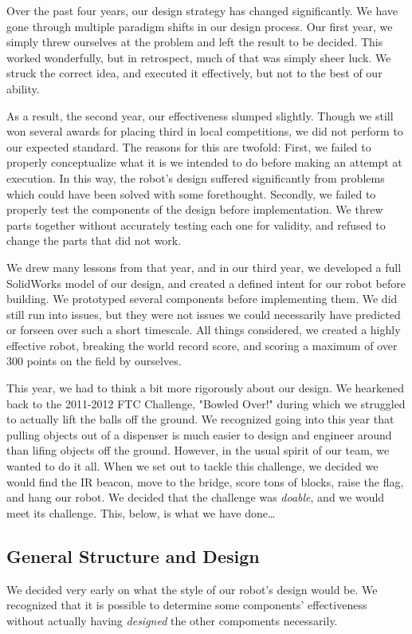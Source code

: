 \documentclass{article}
\begin{document}
Over the past four years, our design strategy has changed significantly. We have gone through multiple paradigm shifts in our design process. Our first year, we simply threw ourselves at the problem and left the result to be decided. This worked wonderfully, but in retrospect, much of that was simply sheer luck. We struck the correct idea, and executed it effectively, but not to the best of our ability. 

As a result, the second year, our effectiveness slumped slightly. Though we still won several awards for placing third in local competitions, we did not perform to our expected standard. The reasons for this are twofold: First, we failed to properly conceptualize what it is we intended to do before making an attempt at execution. In this way, the robot's design suffered significantly from problems which could have been solved with some forethought. Secondly, we failed to properly test the components of the design before implementation. We threw parts together without accurately testing each one for validity, and refused to change the parts that did not work.

We drew many lessons from that year, and in our third year, we developed a full SolidWorks model of our design, and created a defined intent for our robot before building. We prototyped several components before implementing them. We did still run into issues, but they were not issues we could necessarily have predicted or forseen over such a short timescale. All things considered, we created a highly effective robot, breaking the world record score, and scoring a maximum of over 300 points on the field by ourselves.

This year, we had to think a bit more rigorously about our design. We hearkened back to the 2011-2012 FTC Challenge, "Bowled Over!" during which we struggled to actually lift the balls off the ground. We recognized going into this year that pulling objects out of a dispenser is much easier to design and engineer around than lifing objects off the ground. However, in the usual spirit of our team, we wanted to do it all. When we set out to tackle this challenge, we decided we would find the IR beacon, move to the bridge, score tons of blocks, raise the flag, and hang our robot. We decided that the challenge was \textit{doable}, and we would meet its challenge. This, below, is what we have done\ldots

\newpage \subsection{General Structure and Design}
We decided very early on what the style of our robot's design would be. We recognized that it is possible to determine some components' effectiveness without actually having \textit{designed} the other compoments necessarily. 
\end{document}
